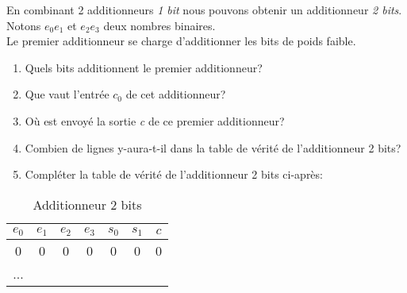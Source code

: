 \documentclass[a4paper,11pt]{article}
\begin{document}
\begin{exo}
En combinant 2 additionneurs \emph{1 bit} nous pouvons obtenir un additionneur \emph{2 bits}. Notons $e_0e_1$ et $e_2e_3$ deux nombres binaires. \\Le premier additionneur se charge d'additionner les bits de poids faible.
\begin{enumerate}
\item Quels bits additionnent le premier additionneur?
\item Que vaut l'entrée $c_0$ de cet additionneur?
\item Où est envoyé la sortie \emph{c} de ce premier additionneur?
\item Combien de lignes y-aura-t-il dans la table de vérité de l'additionneur 2 bits?
\item Compléter la table de vérité de l'additionneur 2 bits ci-après:
\end{enumerate}
\begin{table}[!h]
\begin{center}
\begin{tabular}{|*4{c|}|*3{c|}}
\hline 
$e_0$ & $e_1$ & $e_2$ & $e_3$ & $s_0$ & $s_1$ & $c$ \\ 
\hline 
0 & 0 & 0 & 0 & 0 & 0 & 0 \\ 
\hline 
... &  &  &  &  &  &  \\ 
\hline 
\end{tabular}
\caption{\label{addi}Additionneur 2 bits}
\end{center}
\end{table} 
\end{exo}
\end{document}
